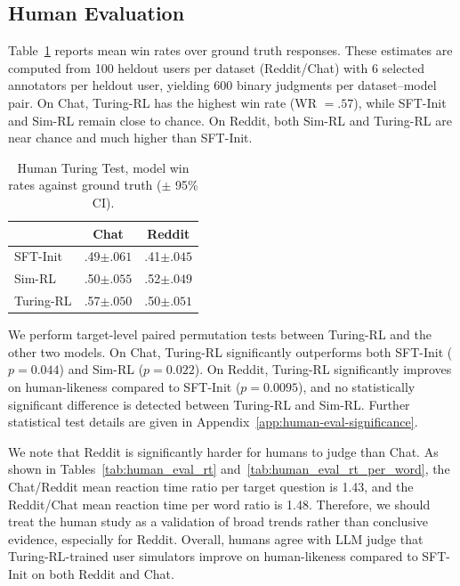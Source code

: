 \documentclass{article} %
\newcommand{\subtle}[1]{{\tiny\color[gray]{0.4}#1}}
\begin{document}
\subsection{Human Evaluation}


Table~\ref{tab:human_eval_winrate} reports mean win rates over ground truth responses. These estimates are computed from 100 heldout users per dataset (Reddit/Chat) with 6 selected annotators per heldout user, yielding 600 binary judgments per dataset--model pair.  On Chat, Turing-RL has the highest win rate (WR $= .57$), while SFT-Init and Sim-RL remain close to chance. On Reddit, both Sim-RL and Turing-RL are near chance and much higher than SFT-Init. 

\begin{table}
\vspace{-3mm}
\centering
\small
\setlength{\tabcolsep}{0pt}
\begin{tabular*}{0.75\linewidth}{@{\extracolsep{\fill}}lcc@{}}
\toprule
 & \textbf{Chat} & \textbf{Reddit} \\
\midrule
SFT-Init    & .49\subtle{$\pm.061$} & .41\subtle{$\pm.045$} \\
Sim-RL    & .50\subtle{$\pm.055$} & .52\subtle{$\pm.049$} \\
Turing-RL & .57\subtle{$\pm.050$} & {.50\subtle{$\pm.051$}} \\
\bottomrule
\end{tabular*}
\vspace{-2mm}
\caption{Human Turing Test, model win rates against ground truth ($\pm$ 95\% CI).}
\vspace{4mm}
\label{tab:human_eval_winrate}
\end{table}

We perform target-level paired permutation tests between Turing-RL and the other two models. On Chat, Turing-RL significantly outperforms both SFT-Init ($p=0.044$) and Sim-RL ($p=0.022$). On Reddit, Turing-RL significantly improves on human-likeness compared to SFT-Init ($p=0.0095$), and no statistically significant difference is detected between Turing-RL and Sim-RL. Further statistical test details are given in Appendix~\ref{app:human-eval-significance}. 

We note that Reddit is significantly harder for humans to judge than Chat. As shown in Tables~\ref{tab:human_eval_rt} and~\ref{tab:human_eval_rt_per_word}, the Chat/Reddit mean reaction time ratio per target question is 1.43, and the Reddit/Chat mean reaction time per word ratio is 1.48. Therefore, we should treat the human study as a validation of broad trends rather than conclusive evidence, especially for Reddit. Overall, humans agree with LLM judge that Turing-RL-trained user simulators improve on human-likeness compared to SFT-Init on both Reddit and Chat.
\end{document}
